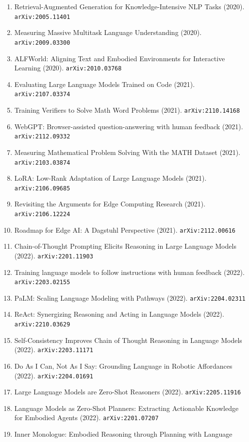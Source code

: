 \documentclass[11pt]{article}
\begin{document}
\begin{enumerate}
  \item Retrieval-Augmented Generation for Knowledge-Intensive NLP Tasks (2020). \texttt{arXiv:2005.11401}
  \item Measuring Massive Multitask Language Understanding (2020). \texttt{arXiv:2009.03300}
  \item ALFWorld: Aligning Text and Embodied Environments for Interactive
  Learning (2020). \texttt{arXiv:2010.03768}
  \item Evaluating Large Language Models Trained on Code (2021). \texttt{arXiv:2107.03374}
  \item Training Verifiers to Solve Math Word Problems (2021). \texttt{arXiv:2110.14168}
  \item WebGPT: Browser-assisted question-answering with human feedback (2021). \texttt{arXiv:2112.09332}
  \item Measuring Mathematical Problem Solving With the MATH Dataset (2021). \texttt{arXiv:2103.03874}
  \item LoRA: Low-Rank Adaptation of Large Language Models (2021). \texttt{arXiv:2106.09685}
  \item Revisiting the Arguments for Edge Computing Research (2021). \texttt{arXiv:2106.12224}
  \item Roadmap for Edge AI: A Dagstuhl Perspective (2021). \texttt{arXiv:2112.00616}
  \item Chain-of-Thought Prompting Elicits Reasoning in Large Language Models (2022). \texttt{arXiv:2201.11903}
  \item Training language models to follow instructions with human feedback (2022). \texttt{arXiv:2203.02155}
  \item PaLM: Scaling Language Modeling with Pathways (2022). \texttt{arXiv:2204.02311}
  \item ReAct: Synergizing Reasoning and Acting in Language Models (2022). \texttt{arXiv:2210.03629}
  \item Self-Consistency Improves Chain of Thought Reasoning in Language Models (2022). \texttt{arXiv:2203.11171}
  \item Do As I Can, Not As I Say: Grounding Language in Robotic Affordances (2022). \texttt{arXiv:2204.01691}
  \item Large Language Models are Zero-Shot Reasoners (2022). \texttt{arXiv:2205.11916}
  \item Language Models as Zero-Shot Planners: Extracting Actionable Knowledge
  for Embodied Agents (2022). \texttt{arXiv:2201.07207}
  \item Inner Monologue: Embodied Reasoning through Planning with Language

\end{enumerate}
\end{document}
